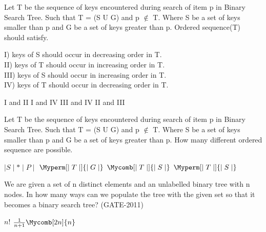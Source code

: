 \begin{questyle}
  \question  Let T be the sequence of keys encountered during search of item p in Binary Search Tree. Such that
             T = (S U G) and p \(\notin\) T. Where S be a set of keys smaller than p and G be a set of keys greater than p.
             Ordered sequence(T) should satisfy.

             I) keys of S should occur in decreasing order in T.\\
             II) keys of T should occur in increasing order in T. \\
             III) keys of S should occur in increasing order in T. \\
             IV) keys of T should occur in decreasing order in T. \\
  \begin{oneparchoices}
    \choice         I and II
    \choice         I and IV
    \CorrectChoice  III and IV
    \choice         II and III

  \end{oneparchoices}

\end{questyle}

\begin{questyle}
  \question  Let T be the sequence of keys encountered during search of item p in Binary Search Tree. Such that
             T = (S U G) and p \(\notin\) T. Where S be a set of keys smaller than p and G be a set of keys greater than p.
             How many different ordered sequence are possible.

  \begin{oneparchoices}
    \choice         \(\mid S \mid * \mid P \mid \)
    \choice         \( \Myperm[\mid T \mid]{\mid G \mid} \)
    \CorrectChoice  \( \Mycomb[\mid T \mid]{\mid S \mid} \)
    \choice         \( \Myperm[\mid T \mid]{\mid S \mid} \)
  \end{oneparchoices}
\end{questyle}


\begin{questyle}
  \question  We are given a set of n distinct elements and an unlabelled binary tree with n
            nodes. In how many ways can we populate the tree with the given set so that it becomes a
            binary search tree?  (GATE-2011)

  \begin{oneparchoices}
    \choice         \( {n!} \)
    \choice         \( \frac{1}{n+1} \Mycomb[2n]{n} \)
  \end{oneparchoices}
\end{questyle}

